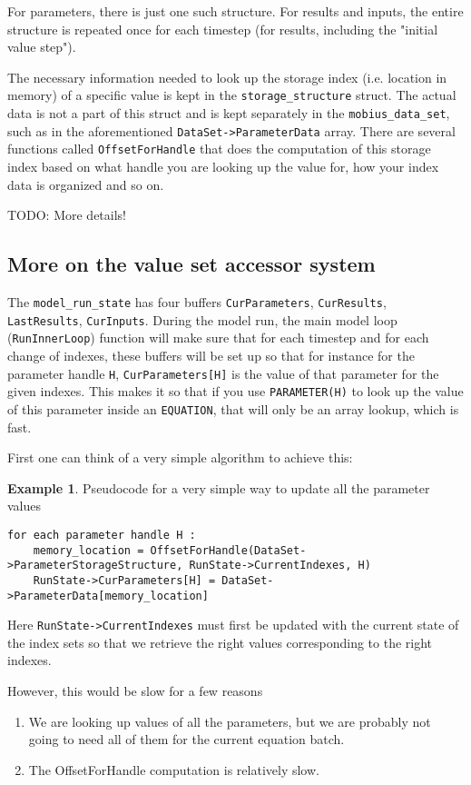 \documentclass[11pt]{article}
\theoremstyle{definition}
\newtheorem{myexample}{Example}
\newenvironment{example}%
  {\begin{lrbox}{\examplebox}%
   \begin{minipage}{\dimexpr\linewidth-2\fboxsep}
   \begin{myexample}}%
  {\end{myexample}%
   \end{minipage}%
   \end{lrbox}%
   \begin{trivlist}
     \item[]\colorbox{silver}{\usebox\examplebox}
   \end{trivlist}}
\begin{document}
For parameters, there is just one such structure. For results and inputs, the entire structure is repeated once for each timestep (for results, including the "initial value step").

The necessary information needed to look up the storage index (i.e. location in memory) of a specific value is kept in the {\tt storage\_structure} struct. The actual data is not a part of this struct and is kept separately in the {\tt mobius\_data\_set}, such as in the aforementioned {\tt DataSet->ParameterData} array. There are several functions called {\tt OffsetForHandle} that does the computation of this storage index based on what handle you are looking up the value for, how your index data is organized and so on.

TODO: More details!


\subsection{More on the value set accessor system}

The {\tt model\_run\_state} has four buffers {\tt CurParameters}, {\tt CurResults}, {\tt LastResults}, {\tt CurInputs}. During the model run, the main model loop ({\tt RunInnerLoop}) function will make sure that for each timestep and for each change of indexes, these buffers will be set up so that for instance for the parameter handle {\tt H}, {\tt CurParameters[H]} is the value of that parameter for the given indexes. This makes it so that if you use {\tt PARAMETER(H)} to look up the value of this parameter inside an {\tt EQUATION}, that will only be an array lookup, which is fast.

First one can think of a very simple algorithm to achieve this:
\begin{example}
Pseudocode for a very simple way to update all the parameter values
\begin{lstlisting}[style = mycpp]
for each parameter handle H :
	memory_location = OffsetForHandle(DataSet->ParameterStorageStructure, RunState->CurrentIndexes, H)
	RunState->CurParameters[H] = DataSet->ParameterData[memory_location]
\end{lstlisting}
Here {\tt RunState->CurrentIndexes} must first be updated with the current state of the index sets so that we retrieve the right values corresponding to the right indexes.
\end{example}

However, this would be slow for a few reasons
\begin{enumerate}[i]
\item We are looking up values of all the parameters, but we are probably not going to need all of them for the current equation batch.
\item The OffsetForHandle computation is relatively slow.
\end{enumerate}
\end{document}
